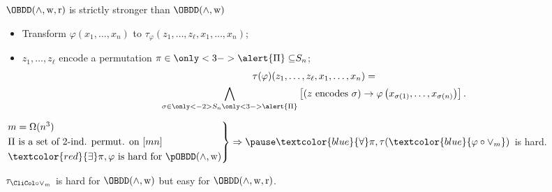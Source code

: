 \begin{frame}{$\OBDD(\land, \weakening, \reordering)$ is strictly stronger than $\OBDD(\land, \weakening)$}

    \pause

    \begin{itemize}
        \item Transform $\varphi(x_1, \dots, x_n)$ to $\tau_{\varphi}(z_1,
            \dots, z_{\ell}, x_1, \dots, x_n)$;
        \item $z_1, \dots, z_{\ell}$ encode a permutation $\pi \in
            \only<3->{\alert{\Pi} \subseteq} S_n$;
        \begin{multline*}
            \tau(\varphi)(z_1, \dots, z_{\ell}, x_1, \dots, x_n) = \\
            \bigwedge\limits_{\sigma \in \only<-2>{S_n}\only<3->{\alert{\Pi}}}
            \left[\left( z \text{ encodes }
                \sigma \right) \to \varphi\left(x_{\sigma(1)}, \dots, x_{\sigma(n)}\right)
            \right].
        \end{multline*}
    \end{itemize}

    \pause
    \pause


    \begin{theorem}[Segerlind 07]
        $
        \begin{rcases}
            m = \Omega(n^3) \\
            \Pi \text{ is a set of 2-ind. permut. on } [mn] \\
            \textcolor{red}{\exists} \pi, \varphi \text{ is hard for } \pOBDD(\land, \weakening)
        \end{rcases}
        \Rightarrow \pause \textcolor{blue}{\forall} \pi, \tau(\textcolor{blue}{\varphi \circ \lor_m})$ is hard.
    \end{theorem}

    \pause
    \begin{theorem}
        $\tau_{\CliCol \circ \lor_m}$ is hard for $\OBDD(\land, \weakening)$ but easy for
        $\OBDD(\land, \weakening, \reordering)$. 
    \end{theorem}
\end{frame}